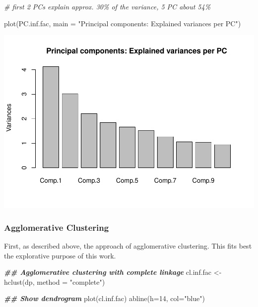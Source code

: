 \documentclass[
]{article}
\newenvironment{Shaded}{\begin{snugshade}}{\end{snugshade}}
\newcommand{\AttributeTok}[1]{\textcolor[rgb]{0.77,0.63,0.00}{#1}}
\newcommand{\CommentTok}[1]{\textcolor[rgb]{0.56,0.35,0.01}{\textit{#1}}}
\newcommand{\DecValTok}[1]{\textcolor[rgb]{0.00,0.00,0.81}{#1}}
\newcommand{\DocumentationTok}[1]{\textcolor[rgb]{0.56,0.35,0.01}{\textbf{\textit{#1}}}}
\newcommand{\FunctionTok}[1]{\textcolor[rgb]{0.00,0.00,0.00}{#1}}
\newcommand{\NormalTok}[1]{#1}
\newcommand{\OtherTok}[1]{\textcolor[rgb]{0.56,0.35,0.01}{#1}}
\newcommand{\SpecialCharTok}[1]{\textcolor[rgb]{0.00,0.00,0.00}{#1}}
\newcommand{\StringTok}[1]{\textcolor[rgb]{0.31,0.60,0.02}{#1}}
\begin{document}
\begin{Shaded}
\begin{Highlighting}[]
\CommentTok{\# first 2 PCs explain approx. 30\% of the variance, 5 PC about 54\%}

\FunctionTok{plot}\NormalTok{(PC.inf.fac, }\AttributeTok{main =} \StringTok{"Principal components: Explained variances per PC"}\NormalTok{)}
\end{Highlighting}
\end{Shaded}

\includegraphics{Influence_factors_files/figure-latex/3.01_CA_preparation_munic-1.pdf}

\begin{Shaded}
\end{Shaded}

\hypertarget{agglomerative-clustering}{%
\subsubsection{Agglomerative
Clustering}\label{agglomerative-clustering}}

First, as described above, the approach of agglomerative clustering.
This fits best the explorative purpose of this work.

\begin{Shaded}
\begin{Highlighting}[]
\DocumentationTok{\#\# Agglomerative clustering with complete linkage}
\NormalTok{cl.inf.fac }\OtherTok{\textless{}{-}} \FunctionTok{hclust}\NormalTok{(dp, }\AttributeTok{method =} \StringTok{"complete"}\NormalTok{)}

\DocumentationTok{\#\# Show dendrogram}
\FunctionTok{plot}\NormalTok{(cl.inf.fac)}
\FunctionTok{abline}\NormalTok{(}\AttributeTok{h=}\DecValTok{14}\NormalTok{, }\AttributeTok{col=}\StringTok{"blue"}\NormalTok{)}
\end{Highlighting}
\end{Shaded}
\end{document}

